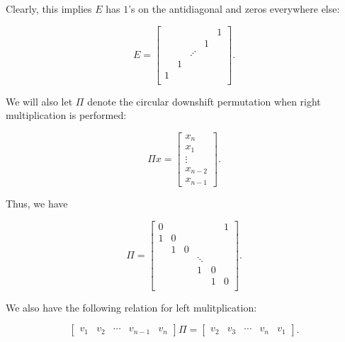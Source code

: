 \noindent
Clearly, this implies $E$ has $1$'s on the antidiagonal and zeros
everywhere else:

\begin{equation}
    E = \begin{bmatrix}
        & & & & 1 \\
        & & & 1 & \\
        & & \iddots & & \\
        & 1 & & & \\
        1 & & & & \\
    \end{bmatrix}.
\end{equation}

\noindent
We will also let $\Pi$ denote the circular downshift permutation
when right multiplication is performed:

\begin{equation}
    \Pi x = \begin{bmatrix} x_{n} \\ x_{1} \\ \vdots \\ x_{n-2} \\ x_{n-1}
        \end{bmatrix}.
\end{equation}

\noindent
Thus, we have

\begin{equation}
    \Pi = \begin{bmatrix}
        0 &   &   &   &   &   1 \\
        1 & 0 &   &   &   &   \\
          & 1 & 0 &   &   &   \\
          &   & &\ddots & &   \\
          &   &   & 1 & 0 &   \\
          &   &   &   & 1 & 0 \\
    \end{bmatrix}.
\end{equation}

\noindent
We also have the following relation for left mulitplication:

\begin{equation}
    \begin{bmatrix} v_{1} & v_{2} & \cdots & v_{n-1} & v_{n} \end{bmatrix}\Pi
        = \begin{bmatrix} v_{2} & v_{3} & \cdots & v_{n} & v_{1} \end{bmatrix}.
\end{equation}

